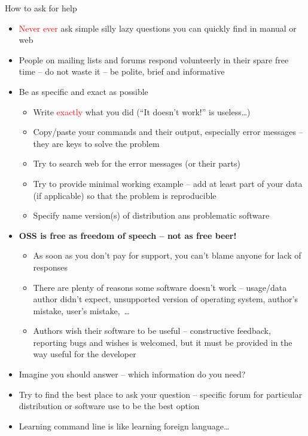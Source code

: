 \documentclass[compress, ucs, xelatex, 11pt, xcolor=svgnames,
  hyperref={
    bookmarks=true,
    unicode=true,
    colorlinks=true,
    pdftitle={Linux, command line and MetaCentrum},
    plainpages=false,
    pdfauthor={Vojtech Zeisek},
    pdfsubject={Course about use of Linux command line, writing shell scripts and using MetaCentrum of CESNET},
    pdfcreator={XeLaTeX},
    pdfkeywords={Linux, GNU, BASH, shell, command line, MetaCentrum},
    linkcolor=DarkRed,
    anchorcolor=DarkBlue,
    citecolor=Indigo,
    filecolor=NavyBlue,
    menucolor=DarkMagenta,
    urlcolor=DarkBlue,
    pdftex},
  url={hyphens, lowtilde} %
  ]{beamer}
\renewcommand{\alert}[1]{\textcolor{red}{#1}}
\begin{document}
\begin{frame}[allowframebreaks]{How to ask for help}
  \label{howtoask}
  \begin{itemize}
    \item \alert{Never ever} ask simple silly lazy questions you can quickly find in manual or web
    \item People on mailing lists and forums respond volunteerly in their spare free time -- do not waste it -- be polite, brief and informative
    \item Be as specific and exact as possible
    \begin{itemize}
      \item Write \alert{exactly} what you did (``It doesn't work!'' is useless\ldots)
      \item Copy/paste your commands and their output, especially error messages -- they are keys to solve the problem
      \item Try to search web for the error messages (or their parts)
      \item Try to provide minimal working example -- add at least part of your data (if applicable) so that the problem is reproducible
      \item Specify name version(s) of distribution ans problematic software
    \end{itemize}
    \item \textbf{OSS is free as freedom of speech -- not as free beer!}
    \begin{itemize}
      \item As soon as you don't pay for support, you can't blame anyone for lack of responses
      \item There are plenty of reasons some software doesn't work -- usage/data author didn't expect, unsupported version of operating system, author's mistake, user's mistake,~\ldots
      \item Authors wish their software to be useful -- constructive feedback, reporting bugs and wishes is welcomed, but it must be provided in the way useful for the developer
    \end{itemize}
    \item Imagine you should answer -- which information do you need?
    \item Try to find the best place to ask your question -- specific forum for particular distribution or software use to be the best option
    \item Learning command line is like learning foreign language\ldots
  \end{itemize}
\end{frame}
\end{document}

